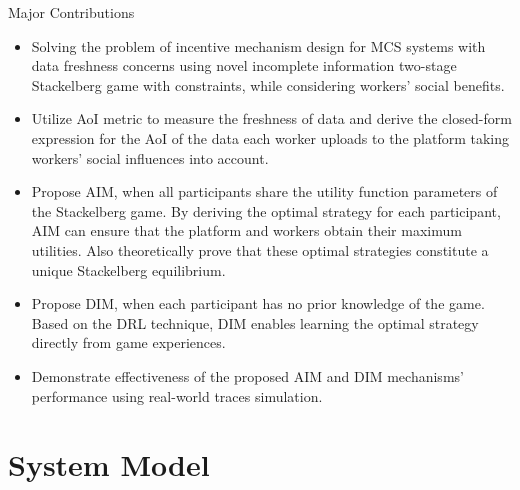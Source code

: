 \documentclass[aspectratio=169,xcolor=dvipsnames]{beamer}
\begin{document}
\begin{frame}[fragile]{Major Contributions}
    \footnotesize %
    \begin{itemize}[<+-| alert@+>]
        \setlength{\itemsep}{0.3cm} %
        \item Solving the problem of incentive mechanism design for MCS systems with data freshness concerns using novel incomplete information two-stage Stackelberg game with constraints, while considering workers' social benefits. 
        
        \item Utilize AoI metric to measure the freshness of data and derive the closed-form expression for the AoI of the data each worker uploads to the platform taking workers’ social influences into account.
        
        \item Propose AIM, when all participants share the utility function parameters of the Stackelberg
        game. By deriving the optimal strategy for each participant, AIM can ensure that the platform and workers obtain their maximum utilities. Also theoretically prove that these optimal strategies constitute a unique Stackelberg equilibrium.
        
        \item Propose  DIM, when each participant has no prior knowledge of the game. Based on the DRL technique, DIM enables learning the optimal strategy directly from game experiences.
        
        \item Demonstrate effectiveness of the proposed AIM and DIM mechanisms' performance using real-world traces simulation.

    \end{itemize}
\end{frame}

\section{System Model}
\end{document}
